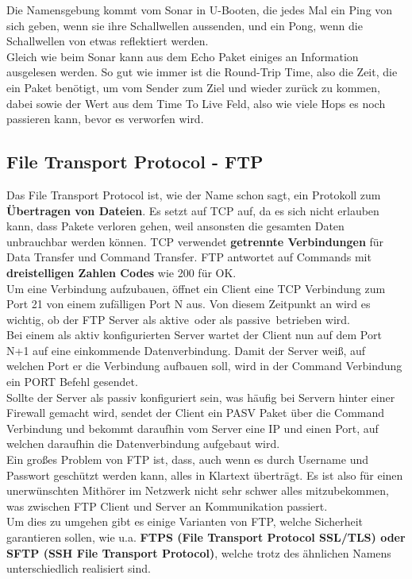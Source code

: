\documentclass[12pt,a4paper]{report}
\begin{document}
\begin{onehalfspace}
Die Namensgebung kommt vom Sonar in U-Booten, die jedes Mal ein Ping von sich geben, wenn sie ihre Schallwellen aussenden, und ein Pong, wenn die Schallwellen von etwas reflektiert werden.\\ 
Gleich wie beim Sonar kann aus dem Echo Paket einiges an Information ausgelesen werden. So gut wie immer ist die Round-Trip Time, also die Zeit, die ein Paket benötigt, um vom Sender zum Ziel und wieder zurück zu kommen, dabei sowie der Wert aus dem Time To Live Feld, also wie viele Hops es noch passieren kann, bevor es verworfen wird.
\subsection{File Transport Protocol - FTP}
Das File Transport Protocol ist, wie der Name schon sagt, ein Protokoll zum \textbf{Übertragen von Dateien}. Es setzt auf TCP auf, da es sich nicht erlauben kann, dass Pakete verloren gehen, weil ansonsten die gesamten Daten unbrauchbar werden können. TCP verwendet \textbf{getrennte Verbindungen} für Data Transfer und Command Transfer. FTP antwortet auf Commands mit \textbf{dreistelligen Zahlen Codes} wie 200 für OK.\\

Um eine Verbindung aufzubauen, öffnet ein Client eine TCP Verbindung zum Port 21 von einem zufälligen Port N aus. Von diesem Zeitpunkt an wird es wichtig, ob der FTP Server als \glqq aktive\grqq \ oder als \glqq passive\grqq \ betrieben wird.\\
Bei einem als aktiv konfigurierten Server wartet der Client nun auf dem Port N+1 auf eine einkommende Datenverbindung. Damit der Server weiß, auf welchen Port er die Verbindung aufbauen soll, wird in der Command Verbindung ein PORT Befehl gesendet.\\
Sollte der Server als passiv konfiguriert sein, was häufig bei Servern hinter einer Firewall gemacht wird, sendet der Client ein PASV Paket über die Command Verbindung und bekommt daraufhin vom Server eine IP und einen Port, auf welchen daraufhin die Datenverbindung aufgebaut wird.\\

Ein großes Problem von FTP ist, dass, auch wenn es durch Username und Passwort geschützt werden kann, alles in Klartext überträgt. Es ist also für einen unerwünschten Mithörer im Netzwerk nicht sehr schwer alles mitzubekommen, was zwischen FTP Client und Server an Kommunikation passiert.\\
Um dies zu umgehen gibt es einige Varianten von FTP, welche Sicherheit garantieren sollen, wie u.a. \textbf{FTPS (File Transport Protocol SSL/TLS) oder SFTP (SSH File Transport Protocol)}, welche trotz des ähnlichen Namens unterschiedlich realisiert sind. 
 

\end{onehalfspace}
\end{document}
